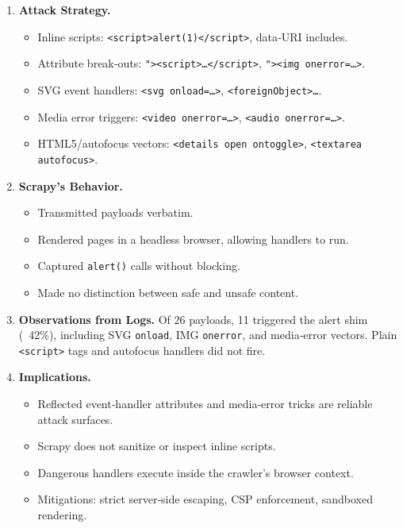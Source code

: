 \begin{enumerate}[label=\alph*)]
  \item \textbf{Attack Strategy.}
    \begin{itemize}[topsep=0pt,itemsep=2pt]
      \item Inline scripts: \texttt{<script>alert(1)</script>}, data‐URI includes.
      \item Attribute break‐outs: \texttt{"\textgreater<script>…</script>}, \texttt{"\textgreater<img onerror=…>}.
      \item SVG event handlers: \texttt{<svg onload=…>}, \texttt{<foreignObject>…}.
      \item Media error triggers: \texttt{<video onerror=…>}, \texttt{<audio onerror=…>}.
      \item HTML5/autofocus vectors: \texttt{<details open ontoggle>}, \texttt{<textarea autofocus>}.
    \end{itemize}

  \item \textbf{Scrapy’s Behavior.}
    \begin{itemize}[topsep=0pt,itemsep=2pt]
      \item Transmitted payloads verbatim.
      \item Rendered pages in a headless browser, allowing handlers to run.
      \item Captured \texttt{alert()} calls without blocking.
      \item Made no distinction between safe and unsafe content.
    \end{itemize}

  \item \textbf{Observations from Logs.}  
    Of 26 payloads, 11 triggered the alert shim (~42\%), including SVG \texttt{onload}, IMG \texttt{onerror}, and media‐error vectors. Plain \texttt{<script>} tags and autofocus handlers did not fire.

  \item \textbf{Implications.}
    \begin{itemize}[topsep=0pt,itemsep=2pt]
      \item Reflected event‐handler attributes and media‐error tricks are reliable attack surfaces.
      \item Scrapy does not sanitize or inspect inline scripts.
      \item Dangerous handlers execute inside the crawler’s browser context.
      \item Mitigations: strict server‐side escaping, CSP enforcement, sandboxed rendering.
    \end{itemize}
\end{enumerate}

